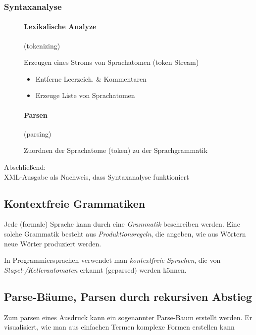 \documentclass[12pt]{report}
\begin{document}
\subsubsection{Syntaxanalyse}
\begin{figure}[H]
  \begin{minipage}[t]{0.45\textwidth}
    \paragraph{Lexikalische Analyze} (tokenizing)
    
    Erzeugen eines Stroms von Sprachatomen (token Stream)
    \begin{itemize}
      \item Entferne Leerzeich. \& Kommentaren
      \item Erzeuge Liste von Sprachatomen
    \end{itemize}
  \end{minipage}
  \hfill
  \begin{minipage}[t]{0.45\textwidth}
    \paragraph{Parsen} (parsing)
    
    Zuordnen der Sprachatome (token) zu der Sprachgrammatik 
  \end{minipage}
\end{figure}
\begin{center}
  Abschließend: \\
  XML-Ausgabe als Nachweis, dass Syntaxanalyse funktioniert
\end{center}

\subsection{Kontextfreie Grammatiken}
Jede (formale) Sprache kann durch eine \textit{Grammatik} beschreiben werden.
Eine solche Grammatik besteht aus \textit{Produktionsregeln}, die angeben, 
wie aus Wörtern neue Wörter produziert werden.

In Programmiersprachen verwendet man \textit{kontextfreie Sprachen}, die von
\textit{Stapel-/Kellerautomaten} erkannt (geparsed) werden können.

\subsection{Parse-Bäume, Parsen durch rekursiven Abstieg}
Zum parsen eines Ausdruck kann ein sogenannter Parse-Baum erstellt werden. Er visualisiert,
wie man aus einfachen Termen komplexe Formen erstellen kann
\end{document}
